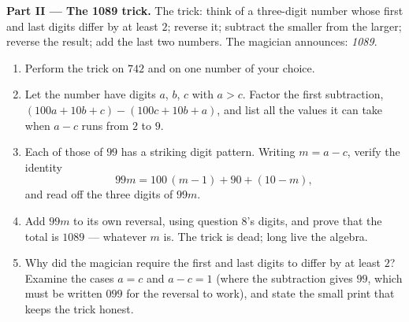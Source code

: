 \begin{problem}
\medskip
\noindent\textbf{Part II --- The 1089 trick.}
The trick: think of a three-digit number whose first and last
digits differ by at least $2$; reverse it; subtract the smaller
from the larger; reverse the result; add the last two numbers.
The magician announces: \emph{1089}.
\begin{enumerate}[resume]
  \item Perform the trick on $742$ and on one number of your
        choice.
  \item Let the number have digits $a$, $b$, $c$ with $a > c$.
        Factor the first subtraction,
        $(100a + 10b + c) - (100c + 10b + a)$, and list all the
        values it can take when $a - c$ runs from $2$ to $9$.
  \item Each of those  of $99$ has a striking digit
        pattern. Writing $m = a - c$, verify the identity
        \[
        99m = 100\,(m - 1) + 90 + (10 - m),
        \]
        and read off the three digits of $99m$.
  \item Add $99m$ to its own reversal, using question 8's
        digits, and prove that the total is $1089$ --- whatever
        $m$ is. The trick is dead; long live the algebra.
  \item Why did the magician require the first and last digits
        to differ by at least $2$? Examine the cases $a = c$ and
        $a - c = 1$ (where the subtraction gives $99$, which
        must be written $099$ for the reversal to work), and
        state the small print that keeps the trick honest.
\end{enumerate}


\end{problem}
